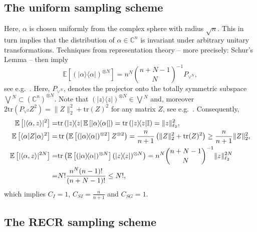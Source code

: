 \subsection{The uniform sampling scheme}

Here, $\alpha$ is chosen uniformly from the complex sphere with radius $\sqrt{n}$.
This in turn implies that the distribution of $\alpha \in \mathbb{C}^n$ is invariant under arbitrary unitary transformations.
Techniques from representation theory -- more precisely: Schur's Lemma -- then imply
\[
  \label{eq:from_schur}
  \mathbb{E} \left[ (|\alpha \rangle \! \langle \alpha| )^{\otimes N} \right] =
  n^N \binom{n+N-1}{N}^{-1} P_{\vee^N},
\]
see e.g.\ \cite[Lemma~1]{scott_tight_2006}.
Here, $P_{\vee^N}$, denotes the projector onto the totally symmetric subspace $\bigvee\!^N \subset \left( \mathbb{C}^n \right)^{\otimes N}$.
Note that $\left(| z \rangle \! \langle  z| \right)^{\otimes N} \in \bigvee\!^N$ and, moreover $2 \mathrm{tr} \left( P_{\vee^2} Z^2 \right)= \| Z \|_2^2 + \mathrm{tr} (Z)^2$ for any matrix $Z$, see e.g.\ \cite[Lemma~17]{kueng_low_2016}.
Consequently,
\begin{align*}
  \mathbb{E} \left[ | \langle\alpha, z \rangle|^2 \right]
  =& \mathrm{tr} \left( | z \rangle \! \langle  z| \, \mathbb{E} \left[ |\alpha \rangle \! \langle\alpha| \right] \right)
  = \mathrm{tr} \left( | z \rangle \! \langle  z| \mathbb{I} \right) = \|  z \|_{\ell_2}^2, \\
  \mathbb{E} \left[
  \langle\alpha| Z |\alpha \rangle^2 \right]
  =& \operatorname{tr} \left( \mathbb{E} \left[ (|\alpha \rangle \! \langle\alpha|)^{\otimes 2} \right] Z^{\otimes 2} \right)
  = \frac{n}{n+1} \left( \| Z \|_2^2 + \mathrm{tr}(Z)^2 \right) \geq \frac{n}{n+1} \| Z \|_2^2, \\
  \mathbb{E} \left[ | \langle\alpha,  z \rangle |^{2N} \right]
  =& \mathrm{tr} \left(\mathbb{E} \left[ (|\alpha \rangle \! \langle\alpha|)^{\otimes N} \right]  (| z\rangle \! \langle  z|)^{\otimes N}  \right)
  = n^N \binom{n+N-1}{N}^{-1} \|  z \|_{\ell_2}^{2N} \\
  =& N! \frac{n^N (n-1)!}{(n+N-1)!} \leq N!,
\end{align*}
which implies $C_I=1$, $C_{SI} = \frac{n}{n+1}$ and $C_{SG}=1$.


\subsection{The RECR sampling scheme}

